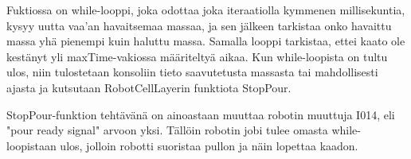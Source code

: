 Fuktiossa on while-looppi, joka odottaa joka iteraatiolla kymmenen millisekuntia, kysyy uutta vaa'an havaitsemaa massaa, ja sen jälkeen tarkistaa onko havaittu massa yhä pienempi kuin haluttu massa. Samalla looppi tarkistaa, ettei kaato ole kestänyt yli maxTime-vakiossa määriteltyä aikaa. Kun while-loopista on tultu ulos, niin tulostetaan konsoliin tieto saavutetusta massasta tai mahdollisesti ajasta ja kutsutaan RobotCellLayerin funktiota StopPour.

StopPour-funktion tehtävänä on ainoastaan muuttaa robotin muuttuja I014, eli "pour ready signal" arvoon yksi. Tällöin robotin jobi tulee omasta while-loopistaan ulos, jolloin robotti suoristaa pullon ja näin lopettaa kaadon.
